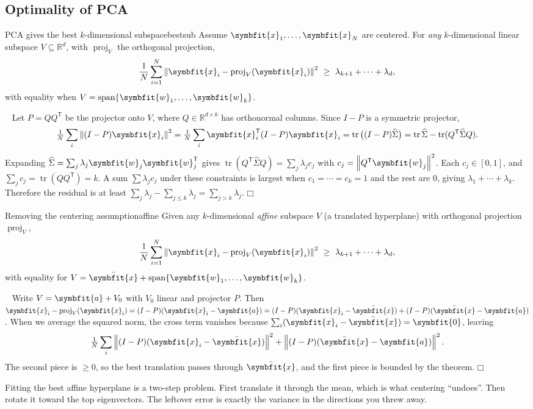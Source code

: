 \documentclass[11pt]{article}
\newcommand{\bm}[1]{\symbfit{#1}}
\newenvironment{proofsketch}{\par\noindent{\itshape Proof.}\ }{\hfill$\mdlgwhtsquare$\par}
\newcommand{\R}{\mathbb{R}}
\newcommand{\vx}{\bm{x}}
\newcommand{\vw}{\bm{w}}
\newcommand{\xbar}{\bar{\bm{x}}}
\newcommand{\Sig}{\widehat{\Sigma}}
\newcommand{\T}{^{\mathsf T}}
\newcommand{\tr}{\operatorname{tr}}
\newcommand{\spn}{\operatorname{span}}
\newcommand{\proj}{\operatorname{proj}}
\newcommand{\norm}[1]{\left\lVert #1\right\rVert}
\begin{document}
\subsection{Optimality of PCA}

\begin{theorem}{PCA gives the best $k$-dimensional subspace}{bestsub}
Assume $\vx_1,\dots,\vx_N$ are centered. For \emph{any} $k$-dimensional linear subspace
$V\subseteq\R^d$, with $\proj_V$ the orthogonal projection,
\[
\frac1N\sum_{i=1}^N\norm{\vx_i-\proj_V(\vx_i)}^2\ \ge\ \lambda_{k+1}+\cdots+\lambda_d ,
\]
with equality when $V=\spn\{\vw_1,\dots,\vw_k\}$.
\end{theorem}
\begin{proofsketch}
Let $P=QQ\T$ be the projector onto $V$, where $Q\in\R^{d\times k}$ has orthonormal columns.
Since $I-P$ is a symmetric projector,
\[
\tfrac1N\sum_i\norm{(I-P)\vx_i}^2=\tfrac1N\sum_i\vx_i\T(I-P)\vx_i=\tr\big((I-P)\Sig\big)=\tr\Sig-\tr(Q\T\Sig Q).
\]
Expanding $\Sig=\sum_j\lambda_j\vw_j\vw_j\T$ gives $\tr(Q\T\Sig Q)=\sum_j\lambda_j c_j$ with
$c_j=\norm{Q\T\vw_j}^2$. Each $c_j\in[0,1]$, and $\sum_j c_j=\tr(QQ\T)=k$. A sum
$\sum\lambda_jc_j$ under these constraints is largest when $c_1=\cdots=c_k=1$ and the
rest are $0$, giving $\lambda_1+\cdots+\lambda_k$. Therefore the residual is at least
$\sum_j\lambda_j-\sum_{j\le k}\lambda_j=\sum_{j>k}\lambda_j$.
\end{proofsketch}

\begin{corollary}{Removing the centering assumption}{affine}
Given any $k$-dimensional \emph{affine} subspace $V$ (a translated hyperplane) with
orthogonal projection $\proj_V$,
\[
\frac1N\sum_{i=1}^N\norm{\vx_i-\proj_V(\vx_i)}^2\ \ge\ \lambda_{k+1}+\cdots+\lambda_d ,
\]
with equality for $V=\xbar+\spn\{\vw_1,\dots,\vw_k\}$.
\end{corollary}
\begin{proofsketch}
Write $V=\bm a+V_0$ with $V_0$ linear and projector $P$. Then
$\vx_i-\proj_V(\vx_i)=(I-P)(\vx_i-\bm a)=(I-P)(\vx_i-\xbar)+(I-P)(\xbar-\bm a)$.
When we average the squared norm, the cross term vanishes because
$\sum_i(\vx_i-\xbar)=\bm0$, leaving
\[
\tfrac1N\sum_i\norm{(I-P)(\vx_i-\xbar)}^2+\norm{(I-P)(\xbar-\bm a)}^2 .
\]
The second piece is $\ge0$, so the best translation passes through $\xbar$, and the first
piece is bounded by the theorem.
\end{proofsketch}

\begin{intuition}
Fitting the best affine hyperplane is a two-step problem. First translate it through the
mean, which is what centering ``undoes''. Then rotate it toward the top eigenvectors.
The leftover error is exactly the variance in the directions you threw away.
\end{intuition}
\end{document}
